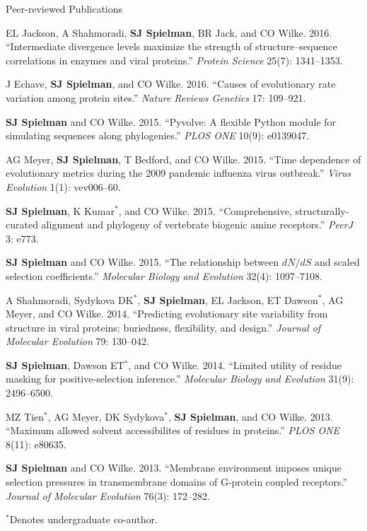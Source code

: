 \documentclass{resume} %
\begin{document}
\begin{rSection}{Peer-reviewed Publications}
\begin{etaremune}[leftmargin=1.5em]
\item EL Jackson, A Shahmoradi, \textbf{SJ Spielman}, BR Jack, and CO Wilke. 2016. ``Intermediate divergence levels maximize the strength of structure--sequence correlations in enzymes and viral proteins.'' \emph{Protein Science} 25(7): 1341--1353.

\item J Echave, \textbf{SJ Spielman}, and CO Wilke. 2016. ``Causes of evolutionary rate variation among protein sites.'' \emph{Nature Reviews Genetics} 17: 109--921.

\item \textbf{SJ Spielman} and CO Wilke. 2015. ``Pyvolve: A flexible Python module for simulating sequences along phylogenies.'' \emph{PLOS ONE} 10(9): e0139047.

\item AG Meyer, \textbf{SJ Spielman}, T Bedford, and CO Wilke. 2015. ``Time dependence of evolutionary metrics during the 2009 pandemic influenza virus outbreak.'' \emph{Virus Evolution} 1(1): vev006--60.

\item \textbf{SJ Spielman}, K Kumar$^\ast$, and CO Wilke. 2015. ``Comprehensive, structurally-curated alignment and phylogeny of vertebrate biogenic amine receptors.'' \emph{PeerJ} 3: e773.

\item \textbf{SJ Spielman} and CO Wilke. 2015. ``The relationship between $dN/dS$ and scaled selection coefficients.'' \emph{Molecular Biology and Evolution} 32(4): 1097--7108.

\item A Shahmoradi, Sydykova DK$^\ast$, \textbf{SJ Spielman}, EL Jackson, ET Dawson$^\ast$, AG Meyer, and CO Wilke. 2014. ``Predicting evolutionary site variability from structure in viral proteins: buriedness, flexibility, and design.'' \emph{Journal of Molecular Evolution} 79: 130--042.

\item \textbf{SJ Spielman}, Dawson ET$^\ast$, and CO Wilke. 2014. ``Limited utility of residue masking for positive-selection inference.'' \emph{Molecular Biology and Evolution} 31(9): 2496--6500.

\item MZ Tien$^\ast$, AG Meyer, DK Sydykova$^\ast$, \textbf{SJ Spielman}, and CO Wilke. 2013. ``Maximum allowed solvent accessibilites of residues in proteins.'' \emph{PLOS ONE} 8(11): e80635.

\item \textbf{SJ Spielman} and CO Wilke. 2013. ``Membrane environment imposes unique selection pressures in transmembrane domains of G-protein coupled receptors.'' \emph{Journal of Molecular Evolution} 76(3): 172--282.

\end{etaremune}

$^\ast$Denotes undergraduate co-author.
\end{rSection}
\end{document}
